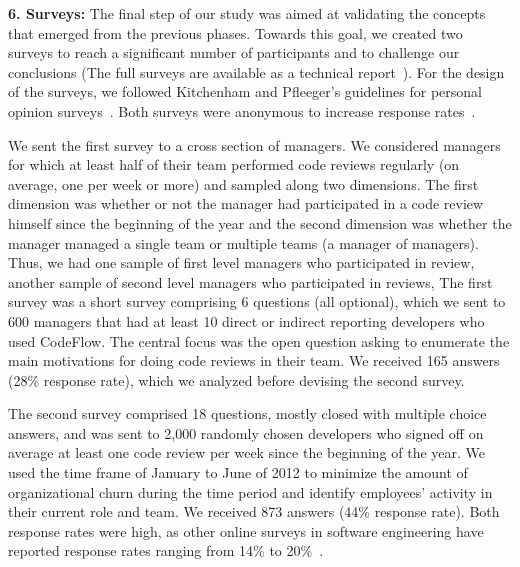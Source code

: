 \textbf{6. Surveys:} The final step of our study was aimed at validating the
concepts that emerged from the previous phases. Towards this goal, we created
two surveys to reach a significant number of participants and to challenge our
conclusions (The full surveys are available as a technical report~\cite{bacchelli2012appendix}). 
For the design of the surveys, we followed Kitchenham and
Pfleeger's guidelines for personal opinion surveys~\cite{kitchenham2008personal}. 
Both surveys were anonymous to increase response rates~\cite{tyagi1989effects}.

We sent the first survey to a cross section of managers.  We considered
managers for which at least half of their team performed code reviews regularly
(on average, one per week or more) and sampled along two dimensions.  The first
dimension was whether or not the manager had participated in a code review
himself since the beginning of the year and the second dimension was whether
the manager managed a single team or multiple teams (a manager of managers).
Thus, we had one sample of first level managers who participated in review,
another sample of second level managers who participated in reviews, \etc  The
first survey was a short survey comprising 6 questions (all optional), which we
sent to 600 managers that had at least 10 direct or indirect reporting
developers who used CodeFlow. The central focus was the open
question asking to enumerate the main motivations for doing code reviews in
their team. We received 165 answers (28\% response rate), which we analyzed
before devising the second survey.

The second survey comprised 18 questions, mostly closed with multiple choice
answers, and was sent to 2,000 randomly chosen developers who signed off on
average at least one code review per week since the beginning of the year. We
used the time frame of January to June of 2012 to minimize the amount of
organizational churn during the time period and identify employees' activity in
their current role and team.  We received 873 answers (44\% response rate). Both
response rates were  high, as other online surveys in software engineering have
reported response rates ranging from 14\% to 20\%~\cite{punter2003conducting}.




